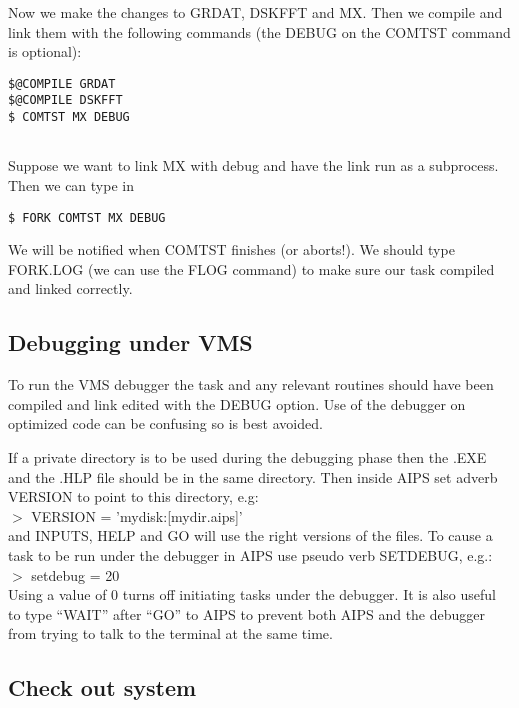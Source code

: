 Now we make the changes to GRDAT, DSKFFT and MX.  Then we compile and
link them with the following commands (the DEBUG on the COMTST command
is optional):
\begin{verbatim}
$@COMPILE GRDAT
$@COMPILE DSKFFT
$ COMTST MX DEBUG


\end{verbatim}
Suppose we want to link MX with debug and have the link run as a
subprocess.  Then we can type in

\begin{verbatim}
$ FORK COMTST MX DEBUG

\end{verbatim}
We will be notified when COMTST finishes (or aborts!).  We should type
FORK.LOG (we can use the FLOG command) to make sure our task compiled
and linked correctly.

\subsection{Debugging under VMS}
To run the VMS debugger the task and any relevant routines should have
been compiled and link edited with the DEBUG option.  Use of the
debugger on optimized code can be confusing so is best avoided.

If a private directory is to be used during the debugging phase then
the .EXE and the .HLP file should be in the same directory.  Then
inside AIPS set adverb VERSION to point to this directory, e.g:\\
$>$ VERSION = 'mydisk:[mydir.aips]'\\
and INPUTS, HELP and GO will use the right versions of the files.  To
cause a task to be run under the debugger in AIPS use pseudo verb
SETDEBUG, e.g.:\\
$>$ setdebug = 20\\


Using a value of 0 turns off initiating tasks under the debugger.  It
is also useful to type ``WAIT'' after ``GO'' to AIPS to prevent both
AIPS and the debugger from trying to talk to the terminal at the same
time.

\subsection{Check out system}

